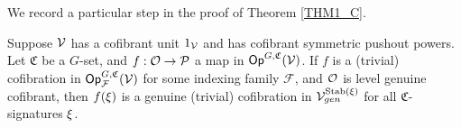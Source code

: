 \documentclass[a4paper,10pt
,draft
]{article}%
\renewcommand{\F}{\mathcal F}
\renewcommand{\1}{\eta}%
\begin{document}
We record a particular step in the proof of Theorem \ref{THM1_C}.
\begin{corollary}
      \label{LGC_COR}
      Suppose $\mathcal V$ has a cofibrant unit $1_{\mathcal V}$ and has cofibrant symmetric pushout powers.
      Let $\mathfrak C$ be a $G$-set, and $f: \mathcal{O} \to \mathcal{P}$ a map in $\mathsf{Op}^{G,\mathfrak C}(\mathcal V)$.
      If $f$ is a (trivial) cofibration in $\Op^{G, \mathfrak C}_\F(\V)$ for some indexing family $\F$,
      and $\mathcal{O}$ is level genuine cofibrant, then
      $f(\xi)$ is a genuine (trivial) cofibration in $\mathcal V^{\mathrm{Stab}(\xi)}_{gen}$ for all $\mathfrak C$-signatures $\xi$.
\end{corollary}
      
\end{document}
